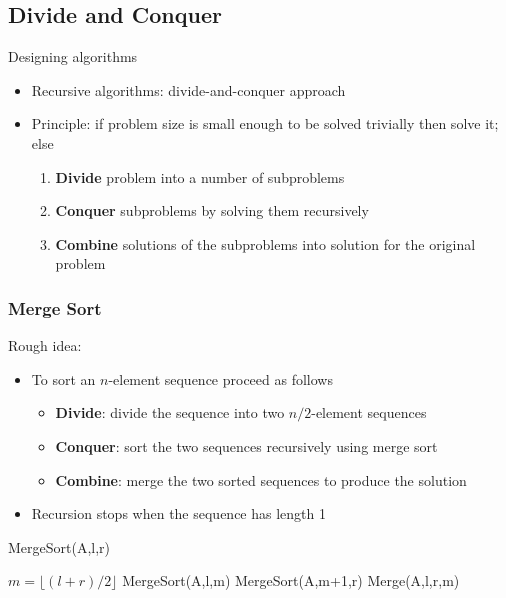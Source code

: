
\subsection{Divide and Conquer}

Designing algorithms
\begin{itemize}
    \item Recursive algorithms: divide-and-conquer approach
    \item Principle: if problem size is small enough to be solved trivially then solve it; else
    \begin{enumerate}
        \item \textbf{Divide} problem into a number of subproblems
        \item \textbf{Conquer} subproblems by solving them recursively
        \item \textbf{Combine} solutions of the subproblems into solution for the original problem
    \end{enumerate}
\end{itemize}

\subsubsection{Merge Sort}
Rough idea:
\begin{itemize}
    \item To sort an $n$-element sequence proceed as follows
    \begin{itemize}
        \item \textbf{Divide}: divide the sequence into two $n/2$-element sequences
        \item \textbf{Conquer}: sort the two sequences recursively using merge sort
        \item \textbf{Combine}: merge the two sorted sequences to produce the solution
    \end{itemize}
    \item Recursion stops when the sequence has length 1
\end{itemize}

\begin{center}
\begin{minipage}{0.6\textwidth} %
\centering %
\begin{algorithm}[H]
\caption{MergeSort(A,l,r)}
 {
$m= \lfloor (l+r)/2 \rfloor$\;
MergeSort(A,l,m)\;
MergeSort(A,m+1,r)\;
Merge(A,l,r,m)\;
}
\end{algorithm}
\end{minipage}
\end{center}

